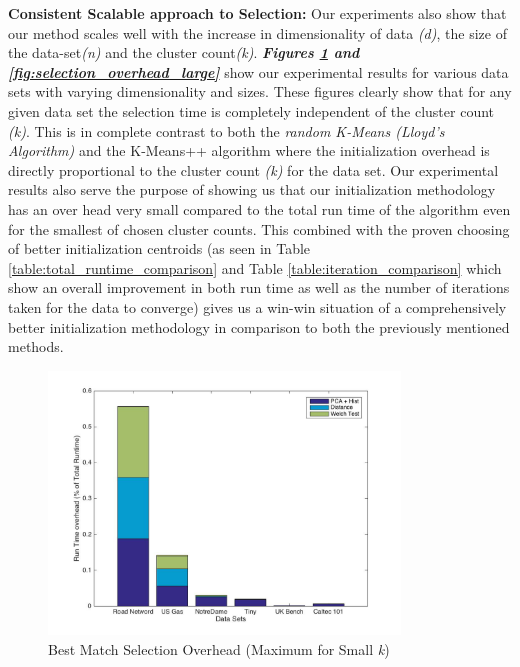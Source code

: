 \documentclass{vldb}
\begin{document}
\textbf{Consistent Scalable approach to Selection:} Our experiments also show that our method scales well with the increase in dimensionality of data \textit{(d)}, the size of the data-set\textit{(n)} and the cluster count\textit{(k)}. \textbf{\textit{Figures \ref{fig:selection_overhead} and \ref{fig:selection_overhead_large}}} show our experimental results for various data sets with varying dimensionality and sizes. These figures clearly show that for any given data set the selection time is completely independent of the cluster count \textit{(k)}. This is in complete contrast to both the  \textit{random K-Means (Lloyd's Algorithm)} and the K-Means++ algorithm where the initialization overhead is directly proportional to the cluster count \textit{(k)} for the data set. Our experimental results also serve the purpose of showing us that our initialization methodology has an over head very small compared to the total run time of the algorithm even for the smallest of chosen cluster counts. This combined with the proven choosing of better initialization centroids (as seen in Table \ref{table:total_runtime_comparison} and Table \ref{table:iteration_comparison} which show an overall improvement in both run time as well as the number of iterations taken for the data to converge) gives us a win-win situation of a comprehensively better initialization methodology in comparison to both the previously mentioned methods.


\begin{figure}[t!]
    \includegraphics[width=\textwidth , height=7cm,keepaspectratio]{stacked_overhead}
    \caption{Best Match Selection Overhead (Maximum for Small \textit{k})}
    \centering
    \label{fig:selection_overhead}
\end{figure}
\end{document}
